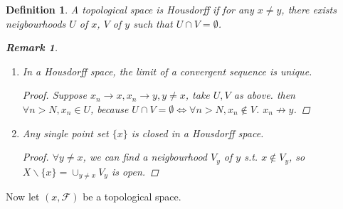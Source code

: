 \documentclass{article}
\newtheorem*{definition}{Definition}
\newtheorem*{remark}{Remark}
\begin{document}
\begin{definition}
    A topological space is Housdorff if for any $x \ne y$, there exists neigbourhoods
    $U$ of $x$, $V$ of $y$ such that $U \cap V = \emptyset$.
    \begin{remark} \hfil
        \begin{enumerate}
            \item In a Housdorff space, the limit of a convergent sequence is unique.
            \begin{proof}
                Suppose $x_n \rightarrow x, x_n \rightarrow y, y \ne x$,
                take $U, V$ as above. then $\forall n > N, x_n \in U$,
                because $U \cap V = \emptyset \Leftrightarrow \forall n > N, x_n \not\in V$.
                $x_n \not\rightarrow y$.
            \end{proof}
            \item Any single point set $\{x\}$ is closed in a Housdorff space.
            \begin{proof}
                $\forall y \ne x$, we can find a neigbourhood $V_y$ of $y$ s.t. 
                $ x \not\in V_y$, so $X\backslash\{x\} = \cup_{y \ne x}{V_y}$ is open.
            \end{proof}
        \end{enumerate}
    \end{remark}
\end{definition}
Now let $(x, \mathcal{F})$ be a topological space.
\end{document}
